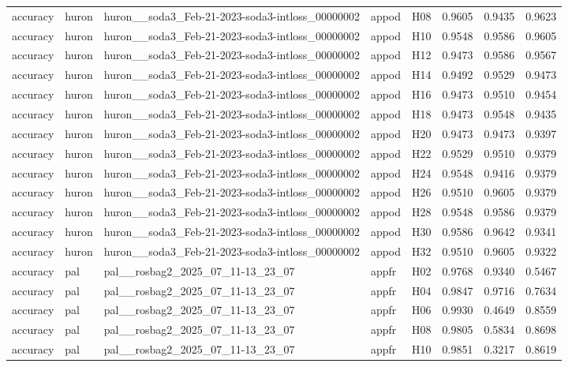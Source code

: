 \begin{table}[tbp]
\begin{tabular}{lllllrrr}
accuracy & huron & huron\_\_soda3\_Feb-21-2023-soda3-intloss\_00000002 & appod & H08 & 0.9605 & 0.9435 & 0.9623 \\
accuracy & huron & huron\_\_soda3\_Feb-21-2023-soda3-intloss\_00000002 & appod & H10 & 0.9548 & 0.9586 & 0.9605 \\
accuracy & huron & huron\_\_soda3\_Feb-21-2023-soda3-intloss\_00000002 & appod & H12 & 0.9473 & 0.9586 & 0.9567 \\
accuracy & huron & huron\_\_soda3\_Feb-21-2023-soda3-intloss\_00000002 & appod & H14 & 0.9492 & 0.9529 & 0.9473 \\
accuracy & huron & huron\_\_soda3\_Feb-21-2023-soda3-intloss\_00000002 & appod & H16 & 0.9473 & 0.9510 & 0.9454 \\
accuracy & huron & huron\_\_soda3\_Feb-21-2023-soda3-intloss\_00000002 & appod & H18 & 0.9473 & 0.9548 & 0.9435 \\
accuracy & huron & huron\_\_soda3\_Feb-21-2023-soda3-intloss\_00000002 & appod & H20 & 0.9473 & 0.9473 & 0.9397 \\
accuracy & huron & huron\_\_soda3\_Feb-21-2023-soda3-intloss\_00000002 & appod & H22 & 0.9529 & 0.9510 & 0.9379 \\
accuracy & huron & huron\_\_soda3\_Feb-21-2023-soda3-intloss\_00000002 & appod & H24 & 0.9548 & 0.9416 & 0.9379 \\
accuracy & huron & huron\_\_soda3\_Feb-21-2023-soda3-intloss\_00000002 & appod & H26 & 0.9510 & 0.9605 & 0.9379 \\
accuracy & huron & huron\_\_soda3\_Feb-21-2023-soda3-intloss\_00000002 & appod & H28 & 0.9548 & 0.9586 & 0.9379 \\
accuracy & huron & huron\_\_soda3\_Feb-21-2023-soda3-intloss\_00000002 & appod & H30 & 0.9586 & 0.9642 & 0.9341 \\
accuracy & huron & huron\_\_soda3\_Feb-21-2023-soda3-intloss\_00000002 & appod & H32 & 0.9510 & 0.9605 & 0.9322 \\
accuracy & pal & pal\_\_rosbag2\_2025\_07\_11-13\_23\_07 & appfr & H02 & 0.9768 & 0.9340 & 0.5467 \\
accuracy & pal & pal\_\_rosbag2\_2025\_07\_11-13\_23\_07 & appfr & H04 & 0.9847 & 0.9716 & 0.7634 \\
accuracy & pal & pal\_\_rosbag2\_2025\_07\_11-13\_23\_07 & appfr & H06 & 0.9930 & 0.4649 & 0.8559 \\
accuracy & pal & pal\_\_rosbag2\_2025\_07\_11-13\_23\_07 & appfr & H08 & 0.9805 & 0.5834 & 0.8698 \\
accuracy & pal & pal\_\_rosbag2\_2025\_07\_11-13\_23\_07 & appfr & H10 & 0.9851 & 0.3217 & 0.8619 \\

\end{tabular}
\end{table}
